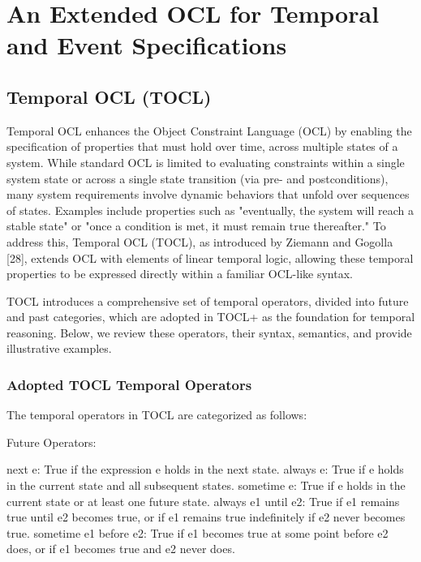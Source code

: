 \section{An Extended OCL for Temporal and Event Specifications}

\subsection{Temporal OCL (TOCL)}

\hspace{1cm} Temporal OCL enhances the Object Constraint Language (OCL) by enabling the 
specification of properties that must hold over time, across multiple states of 
a system. While standard OCL is limited to evaluating constraints within a 
single system state or across a single state transition (via pre- and postconditions), 
many system requirements involve dynamic behaviors that unfold over sequences of states. 
Examples include properties such as "eventually, the system will reach a stable state" 
or "once a condition is met, it must remain true thereafter." To address this, 
Temporal OCL (TOCL), as introduced by Ziemann and Gogolla [28], extends OCL with 
elements of linear temporal logic, allowing these temporal properties to be expressed 
directly within a familiar OCL-like syntax.

TOCL introduces a comprehensive set of temporal operators, divided into future 
and past categories, which are adopted in TOCL+ as the foundation for temporal 
reasoning. Below, we review these operators, their syntax, semantics, and provide 
illustrative examples.

%
\subsubsection{Adopted TOCL Temporal Operators}
The temporal operators in TOCL are categorized as follows:

Future Operators:

next e: True if the expression e holds in the next state.
always e: True if e holds in the current state and all subsequent states.
sometime e: True if e holds in the current state or at least one future state.
always e1 until e2: True if e1 remains true until e2 becomes true, or if e1 remains true indefinitely if e2 never becomes true.
sometime e1 before e2: True if e1 becomes true at some point before e2 does, or if e1 becomes true and e2 never does.

